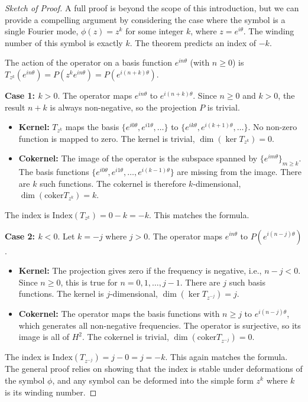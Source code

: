 \begin{proof}[Sketch of Proof]
    A full proof is beyond the scope of this introduction, but we can provide a compelling argument by considering the case where the symbol is a single Fourier mode, $\phi(z) = z^k$ for some integer $k$, where $z=e^{i\theta}$. The winding number of this symbol is exactly $k$. The theorem predicts an index of $-k$.
    
    The action of the operator on a basis function $e^{in\theta}$ (with $n \ge 0$) is $T_{z^k}(e^{in\theta}) = P(z^k e^{in\theta}) = P(e^{i(n+k)\theta})$.
    
    \textbf{Case 1: $k > 0$}.
    The operator maps $e^{in\theta}$ to $e^{i(n+k)\theta}$. Since $n \ge 0$ and $k > 0$, the result $n+k$ is always non-negative, so the projection $P$ is trivial.
    \begin{itemize}
        \item \textbf{Kernel:} $T_{z^k}$ maps the basis $\{e^{i0\theta}, e^{i1\theta}, \dots\}$ to $\{e^{ik\theta}, e^{i(k+1)\theta}, \dots\}$. No non-zero function is mapped to zero. The kernel is trivial, $\dim(\ker T_{z^k})=0$.
        \item \textbf{Cokernel:} The image of the operator is the subspace spanned by $\{e^{im\theta}\}_{m\ge k}$. The basis functions $\{e^{i0\theta}, e^{i1\theta}, \dots, e^{i(k-1)\theta}\}$ are missing from the image. There are $k$ such functions. The cokernel is therefore $k$-dimensional, $\dim(\text{coker} T_{z^k})=k$.
    \end{itemize}
    The index is $\text{Index}(T_{z^k}) = 0 - k = -k$. This matches the formula.
    
    \textbf{Case 2: $k < 0$}. Let $k = -j$ where $j > 0$.
    The operator maps $e^{in\theta}$ to $P(e^{i(n-j)\theta})$.
    \begin{itemize}
        \item \textbf{Kernel:} The projection gives zero if the frequency is negative, i.e., $n-j < 0$. Since $n \ge 0$, this is true for $n = 0, 1, \dots, j-1$. There are $j$ such basis functions. The kernel is $j$-dimensional, $\dim(\ker T_{z^{-j}})=j$.
        \item \textbf{Cokernel:} The operator maps the basis functions with $n \ge j$ to $e^{i(n-j)\theta}$, which generates all non-negative frequencies. The operator is surjective, so its image is all of $H^2$. The cokernel is trivial, $\dim(\text{coker} T_{z^{-j}})=0$.
    \end{itemize}
    The index is $\text{Index}(T_{z^{-j}}) = j - 0 = j = -k$. This again matches the formula.
    The general proof relies on showing that the index is stable under deformations of the symbol $\phi$, and any symbol can be deformed into the simple form $z^k$ where $k$ is its winding number.
\end{proof}

